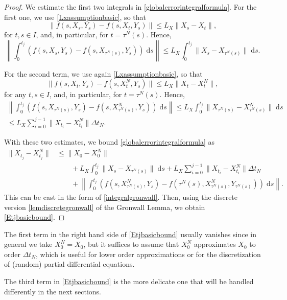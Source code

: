 \documentclass[reqno,12pt]{amsart}
\theoremstyle{plain} %
\theoremstyle{definition} %
\begin{document}
\begin{proof}
    We estimate the first two integrals in \eqref{globalerrorintegralformula}. For the first one, we use \eqref{Lxassumptionbasic}, so that
    $$
        \|f(s, X_s, Y_s) - f(s, X_t, Y_s)\| \leq L_X \|X_s - X_t\|,
    $$
    for $t, s \in I$, and, in particular, for $t = \tau^N(s)$. Hence,
    $$
        \left\|\int_0^{t_j} \left( f(s, X_s, Y_s) - f(s, X_{\tau^N(s)}, Y_s) \right)\;\mathrm{d}s \right\| \leq L_X \int_0^{t_j} \|X_s - X_{\tau^N(s)}\| \;\mathrm{d}s.
    $$
    
    For the second term, we use again \eqref{Lxassumptionbasic}, so that
    $$
        \|f(s, X_t, Y_s) - f(s, X_t^N, Y_s)\| \leq L_X \|X_t - X_t^N\|,
    $$
    for any $t, s \in I$, and, in particular, for $t = \tau^N(s)$. Hence,
    \begin{multline*}
        \left\|\int_0^{t_j} \left( f(s, X_{\tau^N(s)}, Y_s) - f(s, X_{\tau^N(s)}^N, Y_s) \right)\;\mathrm{d}s \right\| \leq L_X \int_0^{t_j} \|X_{\tau^N(s)} - X_{\tau^N(s)}^N\| \;\mathrm{d}s \\
        \leq L_X\sum_{i=0}^{j-1} \|X_{t_i} - X_{t_i}^N\|\Delta t_N.
    \end{multline*}
    
    With these two estimates, we bound \eqref{globalerrorintegralformula} as
    \begin{align*}
        \|X_{t_j} - X_{t_j}^N\| & \leq \|X_0 - X_0^N\| \\
        & \qquad + L_X \int_0^{t_j} \|X_s - X_{\tau^N(s)}\| \;\mathrm{d}s + L_X\sum_{i=0}^{j-1} \|X_{t_i} - X_{t_i}^N\|\Delta t_N \\
        & \qquad + \left\|\int_0^{t_j} \left( f(s, X_{\tau^N(s)}^N, Y_s) - f(\tau^N(s), X_{\tau^N(s)}^N, Y_{\tau^N(s)}) \right)\;\mathrm{d}s\right\|.
    \end{align*}
    This can be cast in the form of \eqref{integralgronwall}. Then, using the discrete version \cref{lemdiscretegronwall} of the Gronwall Lemma, we obtain \eqref{Etjbasicbound}.
\end{proof}

The first term in the right hand side of \eqref{Etjbasicbound} usually vanishes since in general we take $X_0^N = X_0$, but it suffices to assume that $X_0^N$ approximates $X_0$ to order $\Delta t_N$, which is useful for lower order approximations or for the discretization of (random) partial differential equations.

The third term in \eqref{Etjbasicbound} is the more delicate one that will be handled differently in the next sections.
\end{document}
